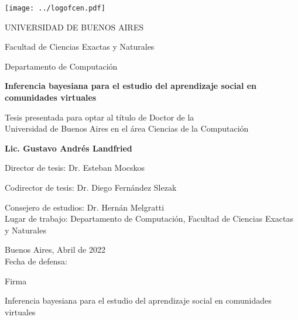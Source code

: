\documentclass[a4paper,10pt]{book}
\author{Gustavo Landfried}
\makeatletter
\renewcommand{\frontmatter}{\cleardoublepage\@mainmatterfalse}
\theoremstyle{definition}
\newcommand{\TITULO}[0]{Inferencia bayesiana para el estudio del aprendizaje social en comunidades virtuales}
\makeatother
\begin{document}
\frontmatter
{}

\begin{center}

\texttt{[image: ../logofcen.pdf]}

\medskip
UNIVERSIDAD DE BUENOS AIRES

Facultad de Ciencias Exactas y Naturales

Departamento de Computaci\'on


\vspace{3cm}

\textbf{\LARGE \TITULO}

\vspace{1cm}



Tesis presentada para optar al t\'itulo de Doctor de la \\
Universidad de Buenos Aires en el \'area Ciencias de la Computaci\'on

\vspace{3cm}

\textbf{Lic. Gustavo Andr\'es Landfried}

\end{center}

\vspace{2.5cm}

\noindent Director de tesis: Dr. Esteban Mocskos 

\noindent Codirector de tesis: Dr. Diego Fern\'andez Slezak

\noindent Consejero de estudios: Dr. Hern\'an Melgratti \\

\noindent Lugar de trabajo: Departamento de Computaci\'on, Facultad de Ciencias Exactas y Naturales

\vspace{0.5cm}

\noindent Buenos Aires, Abril de 2022\\

\noindent Fecha de defensa: \\%

\vspace{0.5cm}

\hspace*{0pt}\hfill Firma \hspace{2cm}

\newpage

\begin{center}
\Large \TITULO \normalsize
\end{center}
\end{document}
